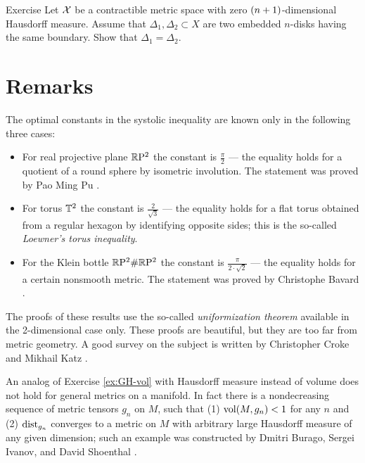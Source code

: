 \begin{thm}{Exercise}\label{ex:2top-discs}
Let $\mathcal{X}$ be a contractible metric space with zero $(n\z+1)$-dimensional Hausdorff measure.
Assume that $\Delta_1,\Delta_2\subset X$ are two embedded $n$-disks having the same boundary.
Show that $\Delta_1=\Delta_2$.
\end{thm}

\section{Remarks}

The optimal constants in the systolic inequality are known only in the following three cases:
\begin{itemize}
\item For real projective plane $\mathbb{R}\mathrm{P}^2$ the constant is $\tfrac\pi2$ --- the equality holds for a quotient of a round sphere by isometric involution. The statement was proved by Pao Ming Pu \cite{pu}.\label{page:pu}
\item For torus $\mathbb{T}^2$ the constant is $\tfrac2{\sqrt{3}}$ --- the equality holds for a flat torus obtained from a regular hexagon by identifying opposite sides; this is the so-called \emph{Loewner's torus inequality}.
\item For the Klein bottle $\mathbb{R}\mathrm{P}^2\#\mathbb{R}\mathrm{P}^2$  the constant is $\tfrac\pi{2\cdot\sqrt2}$ --- the equality holds for a certain nonsmooth metric.
The statement was proved by Christophe Bavard \cite{bavard}.
\end{itemize}
The proofs of these results use the so-called {}\emph{uniformization theorem}   available in the 2-dimensional case only.
These proofs are beautiful, but they are too far from metric geometry.
A good survey on the subject is written by Christopher Croke and Mikhail Katz \cite{croke-katz}.

An analog of Exercise \ref{ex:GH-vol} with Hausdorff measure instead of volume does not hold for general metrics on a manifold.
In fact there is a nondecreasing sequence of metric tensors $g_n$ on $M$, such that (1) $\operatorname{\rm vol}\nolimits(M,g_n)<1$ for any $n$ and (2) $\mathrm{dist}_{g_n}$ converges to a metric on $M$ with arbitrary large Hausdorff measure of any given dimension; such an example was constructed by Dmitri Burago, Sergei Ivanov, and David Shoenthal \cite{burago-ivanov-shoenthal}.
